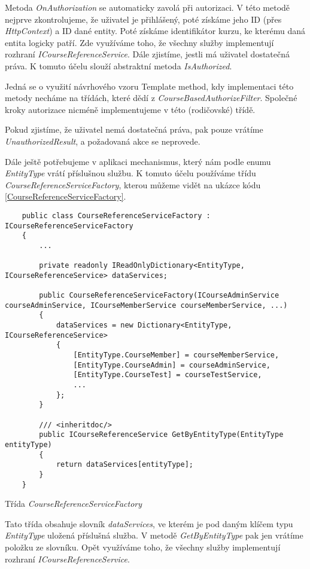 Metoda \textit{OnAuthorization} se automaticky zavolá při autorizaci. V této metodě nejprve zkontrolujeme, že uživatel je přihlášený, poté získáme jeho ID (přes \textit{HttpContext}) a ID dané entity. Poté získáme identifikátor kurzu, ke kterému daná entita logicky patří. Zde využíváme toho, že všechny služby implementují rozhraní \textit{ICourseReferenceService}. 
Dále zjistíme, jestli má uživatel dostatečná práva. K tomuto účelu slouží abstraktní metoda \textit{IsAuthorized}. 

Jedná se o využití návrhového vzoru Template method, kdy implementaci této metody necháme na třídách, které dědí z \textit{CourseBasedAuthorizeFilter}. 
Společné kroky autorizace nicméně implementujeme v této (rodičovské) třídě.

Pokud zjistíme, že uživatel nemá dostatečná práva, pak pouze vrátíme \textit{UnauthorizedResult}, a požadovaná akce se neprovede.

Dále ještě potřebujeme v aplikaci mechanismus, který nám podle enumu \textit{EntityType} vrátí příslušnou službu. K tomuto účelu používáme třídu \textit{CourseReferenceServiceFactory}, kterou můžeme vidět na ukázce kódu \ref{CourseReferenceServiceFactory}.

\begin{program}
	\begin{lstlisting}
	public class CourseReferenceServiceFactory : ICourseReferenceServiceFactory
	{
		...
		
		private readonly IReadOnlyDictionary<EntityType, ICourseReferenceService> dataServices;
		
		public CourseReferenceServiceFactory(ICourseAdminService courseAdminService, ICourseMemberService courseMemberService, ...)
		{
			dataServices = new Dictionary<EntityType, ICourseReferenceService>
			{
				[EntityType.CourseMember] = courseMemberService,
				[EntityType.CourseAdmin] = courseAdminService,
				[EntityType.CourseTest] = courseTestService,
				...
			};
		}
		
		/// <inheritdoc/>
		public ICourseReferenceService GetByEntityType(EntityType entityType)
		{
			return dataServices[entityType];
		}
	}
	\end{lstlisting}
	\caption{Třída \textit{CourseReferenceServiceFactory}}
	\label{CourseReferenceServiceFactory}
\end{program}

Tato třída obsahuje slovník \textit{dataServices}, ve kterém je pod daným klíčem typu \textit{EntityType} uložená příslušná služba.
V metodě \textit{GetByEntityType} pak jen vrátíme položku ze slovníku.
Opět využíváme toho, že všechny služby implementují rozhraní \textit{ICourseReferenceService}.

